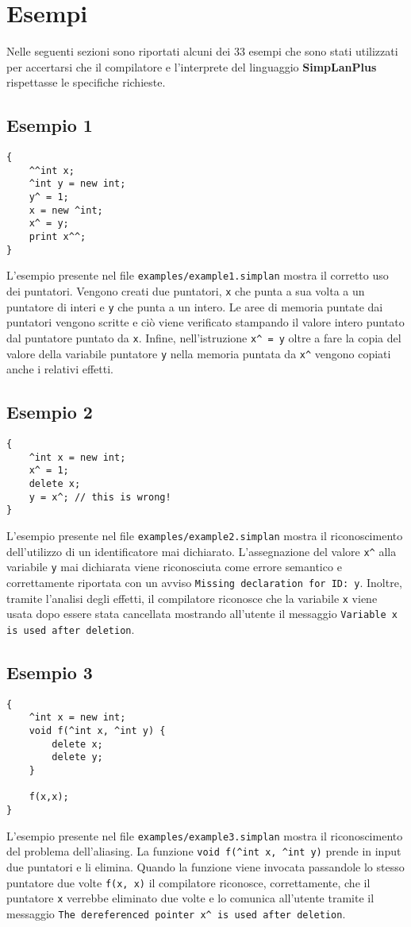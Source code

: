 \documentclass[../report.tex]{subfiles}
\begin{document}
\chapter{Esempi}\label{c:esempi}
Nelle seguenti sezioni sono riportati alcuni dei 33 esempi che sono stati utilizzati per accertarsi che il compilatore e l'interprete del linguaggio \textbf{SimpLanPlus} rispettasse le specifiche richieste.
\section{Esempio 1}\label{s:esempio1}
\begin{lstlisting}
{
    ^^int x;
    ^int y = new int;
    y^ = 1;
    x = new ^int;
    x^ = y;
    print x^^;
}
\end{lstlisting}
L'esempio presente nel file \verb|examples/example1.simplan| mostra il corretto uso dei puntatori.
Vengono creati due puntatori, \verb|x| che punta a sua volta a un puntatore di interi e \verb|y| che punta a un intero.
Le aree di memoria puntate dai puntatori vengono scritte e ciò viene verificato stampando il valore intero puntato dal puntatore puntato da \verb|x|.
Infine, nell'istruzione \verb|x^ = y| oltre a fare la copia del valore della variabile puntatore \verb|y| nella memoria puntata da \verb|x^| vengono copiati anche i relativi effetti.

\section{Esempio 2}\label{s:esempio2}
\begin{lstlisting}
{
    ^int x = new int;
    x^ = 1;
    delete x;
    y = x^; // this is wrong!
}
\end{lstlisting}
L'esempio presente nel file \verb|examples/example2.simplan| mostra il riconoscimento dell'utilizzo di un identificatore mai dichiarato.
L'assegnazione del valore \verb|x^| alla variabile \verb|y| mai dichiarata viene riconosciuta come errore semantico e correttamente riportata con un avviso \verb|Missing declaration for ID: y|.
Inoltre, tramite l'analisi degli effetti, il compilatore riconosce che la variabile \verb|x| viene usata dopo essere stata cancellata mostrando all'utente il messaggio \verb|Variable x is used after deletion|.

\section{Esempio 3}\label{s:esempio3}
\begin{lstlisting}
{
    ^int x = new int;
    void f(^int x, ^int y) {
        delete x;
        delete y;
    }

    f(x,x);
}
\end{lstlisting}
L'esempio presente nel file \verb|examples/example3.simplan| mostra il riconoscimento del problema dell'aliasing.
La funzione \verb|void f(^int x, ^int y)| prende in input due puntatori e li elimina.
Quando la funzione viene invocata passandole lo stesso puntatore due volte \verb|f(x, x)| il compilatore riconosce, correttamente, che il puntatore \verb|x| verrebbe eliminato due volte e lo comunica all'utente tramite il messaggio \verb|The dereferenced pointer x^ is used after deletion|.
\end{document}
